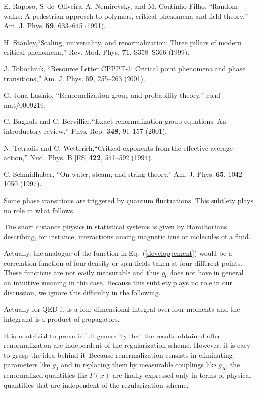 \documentclass[floatfix,preprintnumbers,amsmath,amssymb,prb,12pt]{revtex4-1}
\begin{document}
{{\begin{thebibliography}{10}
E. Raposo, S. de~Oliveira, A. Nemirovsky, and M.
Coutinho-Filho, ``Random walks: A pedestrian approach to polymers,
critical phenomena and field theory,'' Am. J. Phys. \textbf{59},
633--645 (1991).

 H. Stanley,``Scaling, universality, and
renormalization: Three pillars of modern critical phenomena,'' Rev.
Mod. Phys. \textbf{71}, S358--S366 (1999).

J. Tobochnik, ``Resource Letter CPPPT-1:
Critical point phenomena and phase transitions,'' Am. J. Phys.
\textbf{69}, 255--263 (2001).

G. Jona-Lasinio, ``Renormalization group
and probability theory,'' cond-mat/0009219.

C. Bagnuls and C. Bervillier,``Exact
renormalization group equations: An introductory review,'' Phys.
Rep. \textbf{348}, 91--157 (2001).

 N. Tetradis and C. Wetterich,``Critical
exponents from the effective average action,'' Nucl. Phys. B [FS]
\textbf{422}, 541--592 (1994).

 C. Schmidhuber, ``On water, steam, and
string theory,'' Am. J. Phys. \textbf{65}, 1042--1050 (1997).

Some phase transitions are triggered by quantum
fluctuations. This subtlety plays no role in what follows.

The short distance physics in statistical systems
is given by Hamiltonians describing, for instance, interactions
among magnetic ions or molecules of a fluid. 

 Actually, the analogue of the function in
Eq.~(\ref{developpement}) would be a correlation function of four
density or spin fields taken at four different points. These 
functions are not easily measurable and thus $g_0$ does not have in
general an intuitive meaning in this case. Because this subtlety 
plays no role in our discussion, we ignore this
difficulty in the following.

Actually for QED it is a
four-dimensional integral over four-momenta and the integrand is a
product of propagators.

It is nontrivial to prove in full generality that
the results obtained after renormalization are independent of the
regularization scheme. However, it is easy to grasp the idea behind
it. Because renormalization consists in eliminating parameters like
$g_0$ and in replacing them by measurable couplings like $g_R$, the
renormalized quantities like $F(x)$ are finally expressed only in
terms of physical quantities that are independent of the
regularization scheme.\cite{gosdzinsky91}


\end{thebibliography}}}
\end{document}

